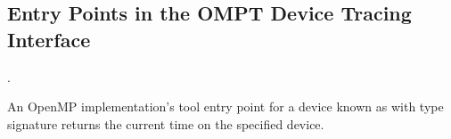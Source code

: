 \begin{comment}
The OpenMP runtime will set the value of \code{*lookup} to point
to a function that can be used to look up device-specific API
functions.  The \code{lookup} function for a device will enable a
tool to look up all functions marked \code{OMPT\_TARG\_API}.  If a
named function is not available in an OpenMP runtime's implementation
of OMPT, lookup will return NULL. Documentation for the names and
type signatures of any additional device-specific API functions
available through \code{lookup} should be provided in the form of
a single character string \code{*documentation}. Ideally, the
documentation string should include not only the type signature but
also necessary descriptive text for how to use the device-specific
API or pointers to external documentation.
\end{comment}

\begin{comment}
\omptruntimeentrypoint{\code{ompt\_get\_device\_id\_t}}
\label{sec:ompt_get_device_id_t}
\label{sec:ompt_get_device_id}

\summary
An OpenMP implementation's tool entry point known as \code{ompt\_get\_device\_id} 
with type signature \code{ompt\_get\_device\_id} returns the device
identifier for the active target device.

\format
\vbox{\ccppspecificstart
\begin{boxedcode}
typedef int (*ompt_get_device_id_t)(void);
\end{boxedcode}
\ccppspecificend}

\descr
This inquiry function is only supported on the host. If the inquiry
function is invoked by a thread not executing in the scope of a
\code{target}, \code{target data}, or \code{target update} construct,
then it will return a value of -1. 

{\em This entry point is async signal safe.}
\end{comment}

\subsection{Entry Points in the OMPT Device Tracing Interface}
\label{sec:ompt-tracing-entry-points}.

\label{sec:ompt_get_device_time_t}

\summary
An OpenMP implementation's tool entry point for a device known 
as  
with type signature  
returns the current time on the specified device.

